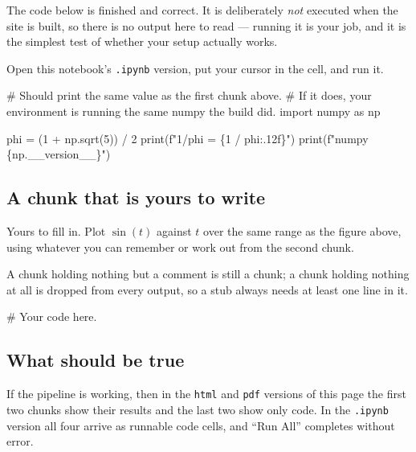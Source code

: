 \documentclass[
  letterpaper,
  DIV=11,
  numbers=noendperiod]{scrartcl}
\newenvironment{Shaded}{\begin{snugshade}}{\end{snugshade}}
\newcommand{\BuiltInTok}[1]{\textcolor[rgb]{0.00,0.23,0.31}{#1}}
\newcommand{\CommentTok}[1]{\textcolor[rgb]{0.37,0.37,0.37}{#1}}
\newcommand{\DecValTok}[1]{\textcolor[rgb]{0.68,0.00,0.00}{#1}}
\newcommand{\ImportTok}[1]{\textcolor[rgb]{0.00,0.46,0.62}{#1}}
\newcommand{\NormalTok}[1]{\textcolor[rgb]{0.00,0.23,0.31}{#1}}
\newcommand{\OperatorTok}[1]{\textcolor[rgb]{0.37,0.37,0.37}{#1}}
\newcommand{\SpecialCharTok}[1]{\textcolor[rgb]{0.37,0.37,0.37}{#1}}
\newcommand{\SpecialStringTok}[1]{\textcolor[rgb]{0.13,0.47,0.30}{#1}}
\begin{document}
The code below is finished and correct. It is deliberately \emph{not}
executed when the site is built, so there is no output here to read ---
running it is your job, and it is the simplest test of whether your
setup actually works.

Open this notebook's \texttt{.ipynb} version, put your cursor in the
cell, and run it.

\begin{Shaded}
\begin{Highlighting}[]
\CommentTok{\# Should print the same value as the first chunk above.}
\CommentTok{\# If it does, your environment is running the same numpy the build did.}
\ImportTok{import}\NormalTok{ numpy }\ImportTok{as}\NormalTok{ np}

\NormalTok{phi }\OperatorTok{=}\NormalTok{ (}\DecValTok{1} \OperatorTok{+}\NormalTok{ np.sqrt(}\DecValTok{5}\NormalTok{)) }\OperatorTok{/} \DecValTok{2}
\BuiltInTok{print}\NormalTok{(}\SpecialStringTok{f"1/phi = }\SpecialCharTok{\{}\DecValTok{1} \OperatorTok{/}\NormalTok{ phi}\SpecialCharTok{:.12f\}}\SpecialStringTok{"}\NormalTok{)}
\BuiltInTok{print}\NormalTok{(}\SpecialStringTok{f"numpy }\SpecialCharTok{\{}\NormalTok{np}\SpecialCharTok{.}\NormalTok{\_\_version\_\_}\SpecialCharTok{\}}\SpecialStringTok{"}\NormalTok{)}
\end{Highlighting}
\end{Shaded}

\subsection{A chunk that is yours to
write}\label{a-chunk-that-is-yours-to-write}

Yours to fill in. Plot \(\sin(t)\) against \(t\) over the same range as
the figure above, using whatever you can remember or work out from the
second chunk.

A chunk holding nothing but a comment is still a chunk; a chunk holding
nothing at all is dropped from every output, so a stub always needs at
least one line in it.

\begin{Shaded}
\begin{Highlighting}[]
\CommentTok{\# Your code here.}
\end{Highlighting}
\end{Shaded}

\subsection{What should be true}\label{what-should-be-true}

If the pipeline is working, then in the \texttt{html} and \texttt{pdf}
versions of this page the first two chunks show their results and the
last two show only code. In the \texttt{.ipynb} version all four arrive
as runnable code cells, and ``Run All'' completes without error.
\end{document}
